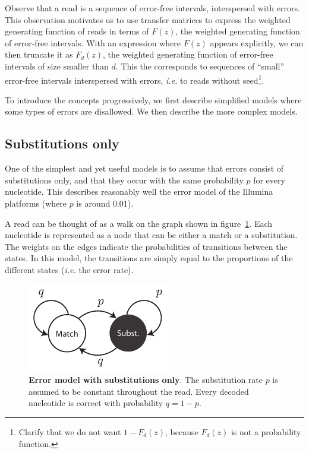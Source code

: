 \documentclass{article}
\begin{document}
Observe that a read is a sequence of error-free intervals, interspersed
with errors. This observation motivates us to use transfer matrices to
express the weighted generating function of reads in terms of $F(z)$, the
weighted generating function of error-free intervals. With an expression
where $F(z)$ appears explicitly, we can then truncate it as $F_d(z)$, the
weighted generating function of error-free intervals of size smaller than
$d$. This the corresponds to sequences of ``small'' error-free intervals
interspersed with errors, \textit{i.e.} to reads without
seed\footnote{Clarify that we do not want $1-F_d(z)$, because $F_d(z)$ is
not a probability function.}.

To introduce the concepts progressively, we first describe simplified
models where some types of errors are disallowed. We then describe the
more complex models.






\subsection{Substitutions only}
\label{sec:substitutions}

One of the simplest and yet useful models is to assume that errors consist
of substitutions only, and that they occur with the same probability $p$
for every nucleotide. This describes reasonably well the error model of
the Illumina platforms (where $p$ is around $0.01$).

A read can be thought of as a walk on the graph shown in
figure~\ref{fig:subonly}. Each nucleotide is represented as a node that
can be either a match or a substitution. The weights on the edges indicate
the probabilities of transitions between the states. In this model, the
transitions are simply equal to the proportions of the different states
(\textit{i.e.} the error rate).

\begin{figure}[h]
\centering
\includegraphics[scale=0.9]{substitutions_only.pdf}
\caption{\textbf{Error model with substitutions only}. 
The substitution rate $p$ is assumed to be constant throughout the read.
Every decoded nucleotide is correct with probability $q = 1-p$.}
\label{fig:subonly}
\end{figure}
\end{document}
